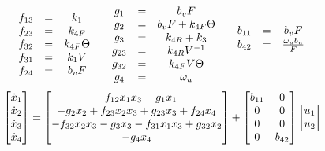 \begin{align*}
    \begin{matrix} 
    \\f_{13} &=& k_1
    \\f_{23} &=& k_{4F}
    \\f_{32} &=& k_{4F} \Theta
    \\f_{31} &=& k_1 V
    \\f_{24} &=& b_v F
     \end{matrix}
    \qquad
    \begin{matrix} 
    \\ g_1    &=& b_v F
    \\ g_2    &=& b_v F + k_{4F} \Theta
    \\ g_{3}  &=& k_{4R}+k_3
    \\ g_{23} &=& k_{4R} V^{-1}
    \\ g_{32} &=& k_{4F} V \Theta
    \\ g_4 &=& \omega_u
     \end{matrix}
    \qquad
    \begin{matrix} 
        b_{11} &=& b_v F
        \\
        b_{42} &=& \frac{\omega_u b_u}{F}
     \end{matrix}
\end{align*}
\begin{equation}{\label{eqn::full_nonlinear}}
     \begin{bmatrix} \dot x_1 \\
        \dot x_2\\
        \dot x_3\\
        \dot x_4 \end{bmatrix} =
    \begin{bmatrix} 
        -f_{12} x_1 x_3
        -g_1 x_1
        \\
        -g_2 x_2
        + f_{23} x_2 x_3
        + g_{23} x_3
        + f_{24} x_4
        \\
        -f_{32} x_2 x_3
        -g_3 x_3
        -f_{31} x_1 x_3
        + g_{32} x_2
        \\
        -g_4 x_4
     \end{bmatrix}
    + \begin{bmatrix} b_{11} & 0\\
          0     & 0\\
          0     & 0\\
          0     & b_{42}   \end{bmatrix}\begin{bmatrix} u_1 \\ u_2  \end{bmatrix}
\end{equation}
